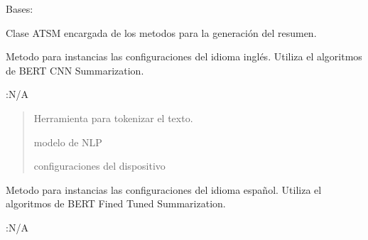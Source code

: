 \documentclass[letterpaper,10pt,english]{sphinxmanual}
\begin{document}
\begin{fulllineitems}
\label{\detokenize{Summarizer:Summarizer.ATSM}}
\pysigstartsignatures
{}
\pysigstopsignatures
\sphinxAtStartPar
Bases: 

\sphinxAtStartPar
Clase ATSM encargada de los metodos para la generación del resumen.

\begin{fulllineitems}
\label{\detokenize{Summarizer:Summarizer.ATSM.Settings_ENG}}
\pysigstartsignatures
{}
\pysigstopsignatures
\sphinxAtStartPar
Metodo para instancias las configuraciones del idioma inglés.
Utiliza el algoritmos de BERT CNN Summarization.
\begin{description}
\sphinxAtStartPar
:N/A

\begin{quote}\begin{description}
\sphinxAtStartPar
Herramienta para tokenizar el texto.

\sphinxAtStartPar
modelo de NLP

\sphinxAtStartPar
configuraciones del dispositivo

\end{description}\end{quote}

\end{description}

\end{fulllineitems}


\begin{fulllineitems}
\label{\detokenize{Summarizer:Summarizer.ATSM.Settings_ESP}}
\pysigstartsignatures
{}
\pysigstopsignatures
\sphinxAtStartPar
Metodo para instancias las configuraciones del idioma español.
Utiliza el algoritmos de BERT Fined Tuned Summarization.
\begin{description}
\sphinxAtStartPar
:N/A


\end{description}
\end{fulllineitems}
\end{fulllineitems}
\end{document}
